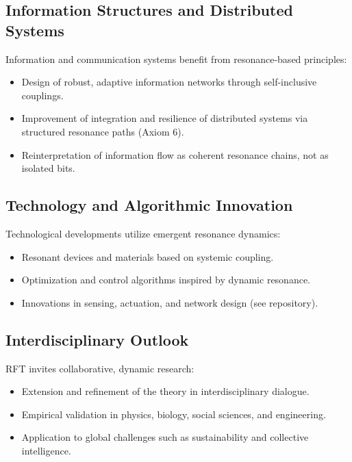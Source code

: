 \documentclass[12pt]{iopart}
\begin{document}
\subsection{Information Structures and Distributed Systems}

Information and communication systems benefit from resonance-based principles:
\begin{itemize}
	\item Design of robust, adaptive information networks through self-inclusive couplings.
	\item Improvement of integration and resilience of distributed systems via structured resonance paths (Axiom 6).
	\item Reinterpretation of information flow as coherent resonance chains, not as isolated bits.
\end{itemize}

\subsection{Technology and Algorithmic Innovation}

Technological developments utilize emergent resonance dynamics:
\begin{itemize}
	\item Resonant devices and materials based on systemic coupling.
	\item Optimization and control algorithms inspired by dynamic resonance.
	\item Innovations in sensing, actuation, and network design (see repository).
\end{itemize}

\subsection{Interdisciplinary Outlook}

RFT invites collaborative, dynamic research:
\begin{itemize}
	\item Extension and refinement of the theory in interdisciplinary dialogue.
	\item Empirical validation in physics, biology, social sciences, and engineering.
	\item Application to global challenges such as sustainability and collective intelligence.
\end{itemize}

\medskip

\newpage
\end{document}
